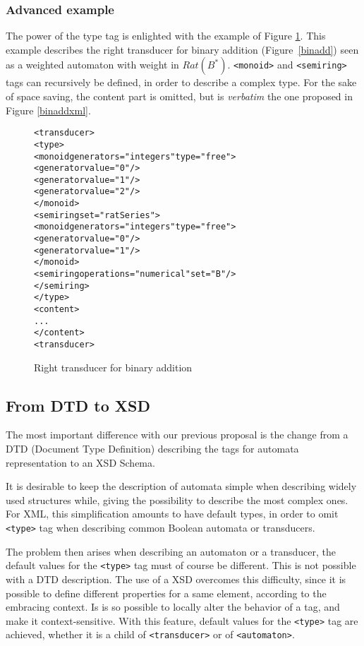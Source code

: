 \documentclass[a4paper]{llncs}
\begin{document}
\subsubsection{Advanced example}

The power of the type tag is enlighted with the example of Figure
\ref{ratseries1}. This example describes the right transducer for
binary addition (Figure~\ref{binadd}) seen as a weighted automaton with
weight in $Rat(B^*)$. \verb|<monoid>| and \verb|<semiring>| tags can
recursively be defined, in order to describe a complex type. For the
sake of space saving, the content part is omitted, but is
\textit{verbatim} the one proposed in Figure \ref{binaddxml}.


\begin{figure}[h]
  \begin{center}
\begin{alltt}
<transducer>
  <type>
    <monoid generators="integers" type="free">
      <generator value="0"/>
      <generator value="1"/>
      <generator value="2"/>
    </monoid>
    <semiring set="ratSeries">
      <monoid generators="integers" type="free">
        <generator value="0"/>
        <generator value="1"/>
      </monoid>
      <semiring operations="numerical" set="B"/>
    </semiring>
  </type>
  <content>
     ...
  </content>
<transducer>
\end{alltt}

\caption{Right transducer for binary addition}
\label{ratseries1}
  \end{center}
\end{figure}

\clearpage

\subsection{From DTD to XSD}
The most important difference with our previous proposal is the change
from a DTD (Document Type Definition) describing the tags for automata
representation to an XSD Schema.

It is desirable to keep the description of automata simple when
describing widely used structures while, giving the possibility to
describe the most complex ones. For XML, this simplification amounts
to have default types, in order to omit \verb|<type>| tag when
describing common Boolean automata or transducers.

The problem then arises when describing an automaton or a transducer,
the default values for the \verb|<type>| tag must of course be
different. This is not possible with a DTD description.  The use of a
XSD overcomes this difficulty, since it is possible to define
different properties for a same element, according to the embracing
context. Is is so possible to locally alter the behavior of a tag, and
make it context-sensitive. With this feature, default values for the
\verb|<type>| tag are achieved, whether it is a child of
\verb|<transducer>| or of \verb|<automaton>|.
\end{document}
